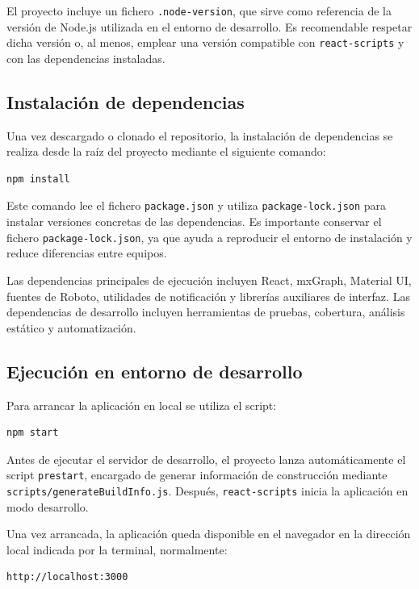 El proyecto incluye un fichero \texttt{.node-version}, que sirve como referencia de la versión de Node.js utilizada en el entorno de desarrollo. Es recomendable respetar dicha versión o, al menos, emplear una versión compatible con \texttt{react-scripts} y con las dependencias instaladas.

\subsection{Instalación de dependencias}

Una vez descargado o clonado el repositorio, la instalación de dependencias se realiza desde la raíz del proyecto mediante el siguiente comando:

\begin{verbatim}
npm install
\end{verbatim}

Este comando lee el fichero \texttt{package.json} y utiliza \texttt{package-lock.json} para instalar versiones concretas de las dependencias. Es importante conservar el fichero \texttt{package-lock.json}, ya que ayuda a reproducir el entorno de instalación y reduce diferencias entre equipos.

Las dependencias principales de ejecución incluyen React, mxGraph, Material UI, fuentes de Roboto, utilidades de notificación y librerías auxiliares de interfaz. Las dependencias de desarrollo incluyen herramientas de pruebas, cobertura, análisis estático y automatización.

\subsection{Ejecución en entorno de desarrollo}

Para arrancar la aplicación en local se utiliza el script:

\begin{verbatim}
npm start
\end{verbatim}

Antes de ejecutar el servidor de desarrollo, el proyecto lanza automáticamente el script \texttt{prestart}, encargado de generar información de construcción mediante \texttt{scripts/generateBuildInfo.js}. Después, \texttt{react-scripts} inicia la aplicación en modo desarrollo.

Una vez arrancada, la aplicación queda disponible en el navegador en la dirección local indicada por la terminal, normalmente:

\begin{verbatim}
http://localhost:3000
\end{verbatim}

